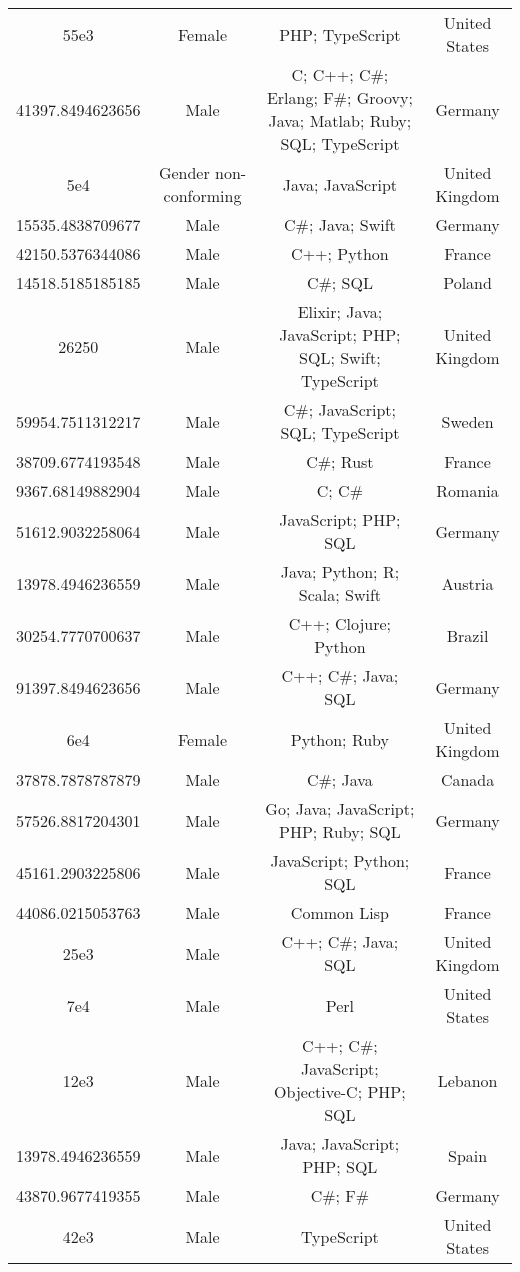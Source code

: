 \begin{center}
\begin{tabular}{ |c|c|c|c| }
55e3  &  Female  &  PHP; TypeScript  &  United States  \\ 
41397.8494623656  &  Male  &  C; C++; C\#; Erlang; F\#; Groovy; Java; Matlab; Ruby; SQL; TypeScript  &  Germany  \\ 
5e4  &  Gender non-conforming  &  Java; JavaScript  &  United Kingdom  \\ 
15535.4838709677  &  Male  &  C\#; Java; Swift  &  Germany  \\ 
42150.5376344086  &  Male  &  C++; Python  &  France  \\ 
14518.5185185185  &  Male  &  C\#; SQL  &  Poland  \\ 
26250  &  Male  &  Elixir; Java; JavaScript; PHP; SQL; Swift; TypeScript  &  United Kingdom  \\ 
59954.7511312217  &  Male  &  C\#; JavaScript; SQL; TypeScript  &  Sweden  \\ 
38709.6774193548  &  Male  &  C\#; Rust  &  France  \\ 
9367.68149882904  &  Male  &  C; C\#  &  Romania  \\ 
51612.9032258064  &  Male  &  JavaScript; PHP; SQL  &  Germany  \\ 
13978.4946236559  &  Male  &  Java; Python; R; Scala; Swift  &  Austria  \\ 
30254.7770700637  &  Male  &  C++; Clojure; Python  &  Brazil  \\ 
91397.8494623656  &  Male  &  C++; C\#; Java; SQL  &  Germany  \\ 
6e4  &  Female  &  Python; Ruby  &  United Kingdom  \\ 
37878.7878787879  &  Male  &  C\#; Java  &  Canada  \\ 
57526.8817204301  &  Male  &  Go; Java; JavaScript; PHP; Ruby; SQL  &  Germany  \\ 
45161.2903225806  &  Male  &  JavaScript; Python; SQL  &  France  \\ 
44086.0215053763  &  Male  &  Common Lisp  &  France  \\ 
25e3  &  Male  &  C++; C\#; Java; SQL  &  United Kingdom  \\ 
7e4  &  Male  &  Perl  &  United States  \\ 
12e3  &  Male  &  C++; C\#; JavaScript; Objective-C; PHP; SQL  &  Lebanon  \\ 
13978.4946236559  &  Male  &  Java; JavaScript; PHP; SQL  &  Spain  \\ 
43870.9677419355  &  Male  &  C\#; F\#  &  Germany  \\ 
42e3  &  Male  &  TypeScript  &  United States  \\ 

\end{tabular}
\end{center}
